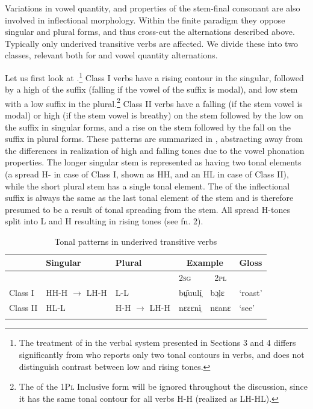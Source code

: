 \documentclass[output=paper
,newtxmath
,modfonts
,nonflat]{langsci/langscibook}
\begin{document}
Variations in vowel quantity,  and properties of the stem-final consonant are also involved in inflectional morphology.  Within the finite paradigm they oppose singular and plural forms, and thus cross-cut the  alternations described above.  Typically only underived transitive verbs are affected.  We divide these into two classes, relevant both for  and vowel quantity alternations. 

Let us first look at .\footnote{The treatment of  in the verbal system presented in Sections 3 and 4 differs significantly from \citet{gjersøe2017} who reports only two tonal contours in verbs, and does not distinguish contrast between low and rising tones.} Class I verbs have a rising contour in the singular, followed by a high  of the suffix (falling if the vowel of the suffix is modal), and low stem with a low suffix in the plural.\footnote{The  of the 1P\textsc{l} Inclusive form will be ignored throughout the discussion, since it has the same tonal contour for all verbs H-H (realized as LH-HL).} Class II verbs have a falling  (if the stem vowel is modal) or high (if the stem vowel is breathy)  on the stem followed by the low  on the suffix in singular forms, and a rise on the stem followed by the fall on the suffix in plural forms. These patterns are summarized in , abstracting away from the differences in realization of high and falling tones due to the vowel phonation properties.  The longer singular stem is represented as having two tonal elements (a spread H- in case of Class I, shown as HH, and an HL in case of Class II), while the short plural stem has a single tonal element.  The  of the inflectional suffix is always the same as the last tonal element of the stem and is therefore presumed to be a result of tonal spreading from the stem. All spread H-tones split into L and H resulting in rising tones (see fn. 2).  

\begin{table}
\begin{tabularx}{\textwidth}{lllXXX}
\lsptoprule
 & Singular & Plural & \multicolumn{2}{c}{Example} & Gloss\\
\midrule
&  &  & \scshape 2sg & \multicolumn{1}{c}{\scshape 2pl} & \\
Class I & HH-H $\rightarrow$ LH-H & L-L & bṳ̌uulí̤ & bɔ̤lɛ & ‘roast’\\
Class II & HL-L & H-H $\rightarrow$ LH-H & nɛɛɛnì̤ & nɛanɛ & ‘see’\\
\lspbottomrule
\end{tabularx}
\caption{Tonal patterns in underived transitive verbs}
\label{tab:monich:7}
\end{table}
\end{document}
